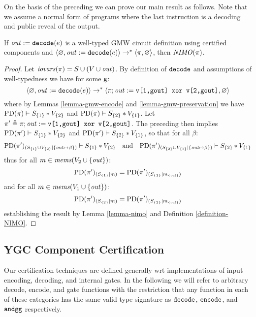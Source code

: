 On the basis of the preceding we can prove our main result as
follows. Note that we assume a normal form of programs where the last
instruction is a decoding and public reveal of the output.
\begin{theorem}
  \label{theorem-gmw-NIMO}
  If $\mathit{out} := \texttt{decode}(e)$ is a well-typed GMW circuit
  definition using certified components and
  $\langle \varnothing,\mathit{out} := \texttt{decode}(e) \rangle \xrightarrow{}^{*}
  \langle \pi,\varnothing \rangle$, then $\mathit{NIMO}(\pi)$.
\end{theorem}
\begin{proof}
  Let $\mathit{iovars}(\pi) = S \cup (V \cup \mathit{out})$. By definition of $\texttt{decode}$
  and assumptions of well-typedness we have for some $\texttt{g}$:
  $$
  \langle \varnothing,\mathit{out} := \texttt{decode}(e) \rangle \xrightarrow{}^{*}
  \langle \pi;\mathit{out} := \texttt{v[1,gout] xor v[2,gout]},\varnothing \rangle
  $$
  where by Lemmas \ref{lemma-gmw-encode} and \ref{lemma-gmw-preservation} we
  have $\mathrm{PD}(\pi) \vdash S_{\{1\}} * V_{\{2\}}$ and
  $\mathrm{PD}(\pi) \vdash S_{\{2\}} * V_{\{1\}}$.
  Let $\pi' \triangleq \pi;\mathit{out} := \texttt{v[1,gout] xor v[2,gout]}$. The
  preceding then implies
  $\mathrm{PD}(\pi') \vdash S_{\{1\}} * V_{\{2\}}$ and
  $\mathrm{PD}(\pi') \vdash S_{\{2\}} * V_{\{1\}}$,
  so that for all $\beta$:
  $$\mathrm{PD}(\pi')_{({S_{\{1\}} \cup V_{\{2\}}}|{\{ \mathit{out} \mapsto \beta \}})} \vdash S_{\{1\}} * V_{\{2\}}
  \quad \text{and} \quad
    \mathrm{PD}(\pi')_{({S_{\{2\}} \cup V_{\{1\}}}|{\{ \mathit{out} \mapsto \beta \}})} \vdash S_{\{2\}} * V_{\{1\}}$$
  thus for all $m \in \mathit{mems}(V_2 \cup \{ \mathit{out} \})$:
  $$\mathrm{PD}(\pi')_{({S_{\{1\}}}|{m})}
  = \mathrm{PD}(\pi')_{({S_{\{1\}}}|{m_{\{\mathit{out}\}}})}$$
  and for all $m \in \mathit{mems}(V_1 \cup \{ \mathit{out} \})$:
  $$\mathrm{PD}(\pi')_{({S_{\{2\}}}|{m})}
  = \mathrm{PD}(\pi')_{({S_{\{2\}}}|{m_{\{\mathit{out}\}}})}$$
  establishing the result by Lemma \ref{lemma-nimo} and Definition \ref{definition-NIMO}. 
\end{proof}

\subsection{YGC Component Certification}
\label{section-ygc-certification}

Our certification techniques are defined generally wrt implementations
of input encoding, decoding, and internal gates. In the following we
will refer to arbitrary decode, encode, and gate functions with the
restriction that any function in each of these categories has the same
valid type signature as $\texttt{decode}$, $\texttt{encode}$, and
$\texttt{andgg}$ respectively.

